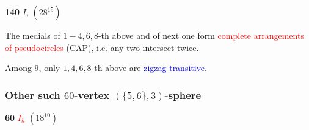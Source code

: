 \documentclass{beamer}
\begin{document}
\begin{frame}
\begin{center}
\begin{minipage}{2.2cm}
{\bf 140}   $I$, $(28^{15})$
\end{minipage}
\end{center}
The medials of $1-4,6,8$-th above  and of next one  form  
\textcolor{red}{complete arrangements of pseudocircles} (CAP),
i.e.  any two intersect twice.

Among $9$, only $1,4,6,8$-th above are 
\textcolor{blue}{zigzag-transitive}. 

\end{frame}

\begin{frame}\frametitle{Other such  $60$-vertex $(\{5,6\},3)$-sphere}
\vspace{-3mm}
\begin{center} 
\begin{minipage}{4.4cm}
\centering
{}\par
{\bf 60} \textcolor{red}{$I_{h}$} $(18^{10})$
\end{minipage}
\begin{minipage}{4.4cm}
\centering

\end{minipage}
\end{center}
\end{frame}
\end{document}
